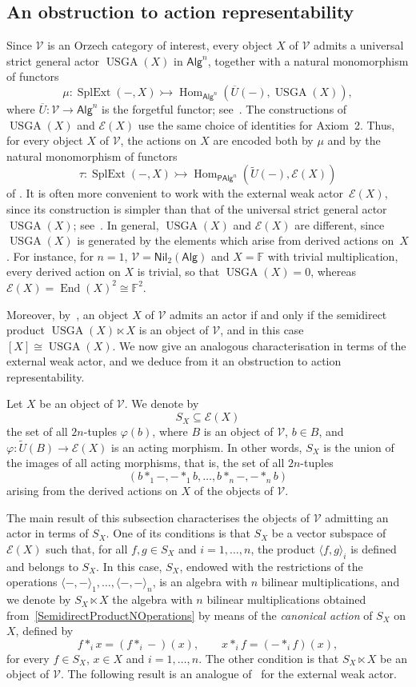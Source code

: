 \documentclass[reqno,a4paper]{amsart}
\theoremstyle{plain}
\theoremstyle{definition}
\theoremstyle{remark}
\numberwithin{equation}{section}
\newcommand{\F}{\mathbb{F}}
\newcommand{\E}{\mathcal{E}}
\newcommand{\V}{\mathcal{V}}
\DeclareMathOperator{\Hom}{Hom}
\DeclareMathOperator{\SplExt}{SplExt}
\DeclareMathOperator{\End}{End}
\DeclareMathOperator{\USGA}{USGA}
\newcommand{\Alg}{\ensuremath{\mathsf{Alg}}}
\newcommand{\PAlg}{\ensuremath{\mathsf{PAlg}}}
\newcommand{\Nil}{\ensuremath{\mathsf{Nil}}}
\begin{document}
\subsection{An obstruction to action representability}\label{SecObstruction}

Since $\V$ is an Orzech category of interest, every object $X$ of $\V$ admits a universal strict general actor $\USGA(X)$ in $\Alg^n$, together with a natural monomorphism of functors
\[
\mu\colon
\SplExt(-,X)
\rightarrowtail
\Hom_{\Alg^n}(\overline U(-),\USGA(X)),
\]
where $\overline U\colon\V\to\Alg^n$ is the forgetful functor; see~\cite{Casas}. The constructions of $\USGA(X)$ and $\E(X)$ use the same choice of identities for Axiom~2. Thus, for every object $X$ of $\V$, the actions on $X$ are encoded both by $\mu$ and by the natural monomorphism of functors
\[
\tau\colon
\SplExt(-,X)
\rightarrowtail
\Hom_{\PAlg^n}(\widetilde U(-),\E(X))
\]
of . It is often more convenient to work with the external weak actor~$\E(X)$, since its construction is simpler than that of the universal strict general actor $\USGA(X)$; see~\cite[Section~4]{Casas}.
In general, $\USGA(X)$ and $\E(X)$ are different, since $\USGA(X)$ is generated by the elements which arise from derived actions on~$X$. For instance, for $n=1$, $\V=\Nil_2(\Alg)$ and $X=\F$ with trivial multiplication, every derived action on $X$ is trivial, so that $\USGA(X)=0$, whereas $\E(X)=\End(X)^2\cong\F^2$.

Moreover, by~\cite[Theorem~3.9]{Casas}, an object $X$ of $\V$ admits an actor if and only if the semidirect product $\USGA(X)\ltimes X$ is an object of $\V$, and in this case $[X]\cong\USGA(X)$. We now give an analogous characterisation in terms of the external weak actor, and we deduce from it an obstruction to action representability.

Let $X$ be an object of $\V$. We denote by
\[
S_X\subseteq\E(X)
\]
the set of all $2n$-tuples $\varphi(b)$, where $B$ is an object of $\V$, $b\in B$, and $\varphi\colon\widetilde U(B)\to\E(X)$ is an acting morphism. In other words, $S_X$ is the union of the images of all acting morphisms, that is, the set of all $2n$-tuples
\[
(b\ast_1-,-\ast_1b,\ldots,b\ast_n-,-\ast_nb)
\]
arising from the derived actions on $X$ of the objects of $\V$.

The main result of this subsection characterises the objects of $\V$ admitting an actor in terms of $S_X$. One of its conditions is that $S_X$ be a vector subspace of $\E(X)$ such that, for all $f,g\in S_X$ and $i=1,\ldots,n$, the product $\langle f,g\rangle_i$ is defined and belongs to $S_X$. In this case, $S_X$, endowed with the restrictions of the operations $\langle-,-\rangle_1,\ldots,\langle-,-\rangle_n$, is an algebra with $n$ bilinear multiplications, and we denote by $S_X\ltimes X$ the algebra with $n$ bilinear multiplications obtained from~\eqref{SemidirectProductNOperations} by means of the \emph{canonical action} of $S_X$ on $X$, defined by
\[
f\ast_ix=(f\ast_i-)(x),
\qquad
x\ast_if=(-\ast_if)(x),
\]
for every $f\in S_X$, $x\in X$ and $i=1,\ldots,n$. The other condition is that $S_X\ltimes X$ be an object of $\V$. The following result is an analogue of~\cite[Theorem~3.9]{Casas} for the external weak actor.
\end{document}
